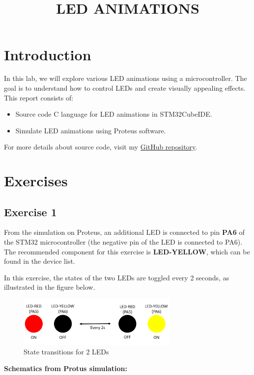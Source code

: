 \documentclass[twoside, final]{hcmut_report}
\title{\Large LED ANIMATIONS}
\begin{document}
\coverpage
\pagestyle{empty}
\tableofcontents
\pagestyle{fancy}
\pagebreak
\section{Introduction}
In this lab, we will explore various LED animations using a microcontroller. The goal is to understand how to control LEDs and create visually appealing effects.
This report consists of:
\begin{itemize}
    \item Source code C language for LED animations in STM32CubeIDE.
    \item Simulate LED animations using Proteus software.
\end{itemize}
For more details about source code, visit my \href{https://batmaon512.github.io/Microcontroller-251}{GitHub repository}.
\section{Exercises}
\subsection{Exercise 1}
From the simulation on Proteus, an additional LED is connected to pin \textbf{PA6} of the STM32 microcontroller (the negative pin of the LED is connected to PA6). The recommended component for this exercise is \textbf{LED-YELLOW}, which can be found in the device list.

In this exercise, the states of the two LEDs are toggled every 2 seconds, as illustrated in the figure below.

\begin{figure}[h]
    \centering
    \includegraphics[width=0.7\textwidth]{graphics/f1.png}
    \caption{State transitions for 2 LEDs}
\end{figure}

\pagebreak
\textbf{Schematics from Protus simulation:}
\end{document}
